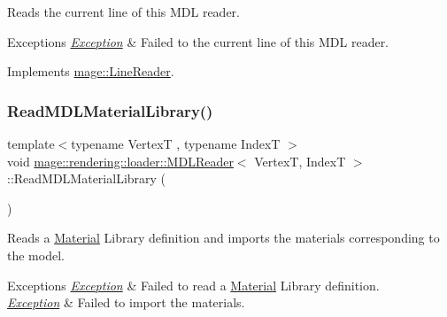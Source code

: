 Reads the current line of this M\+DL reader.


\begin{DoxyExceptions}{Exceptions}
{\em \mbox{\hyperlink{classmage_1_1_exception}{Exception}}} & Failed to the current line of this M\+DL reader. \\
\hline
\end{DoxyExceptions}


Implements \mbox{\hyperlink{classmage_1_1_line_reader_a8c81989a9d59ae31dd19e6d3961cfaf1}{mage\+::\+Line\+Reader}}.

\mbox{\label{classmage_1_1rendering_1_1loader_1_1_m_d_l_reader_a40697c5c645e00ba6f4cc5cd28872b8f}} 
\subsubsection{\texorpdfstring{Read\+M\+D\+L\+Material\+Library()}{ReadMDLMaterialLibrary()}}
{\footnotesize\ttfamily template$<$typename VertexT , typename IndexT $>$ \\
void \mbox{\hyperlink{classmage_1_1rendering_1_1loader_1_1_m_d_l_reader}{mage\+::rendering\+::loader\+::\+M\+D\+L\+Reader}}$<$ VertexT, IndexT $>$\+::Read\+M\+D\+L\+Material\+Library (\begin{DoxyParamCaption}{ }\end{DoxyParamCaption})\hspace{0.3cm}{\ttfamily [private]}}

Reads a \mbox{\hyperlink{classmage_1_1rendering_1_1_material}{Material}} Library definition and imports the materials corresponding to the model.


\begin{DoxyExceptions}{Exceptions}
{\em \mbox{\hyperlink{classmage_1_1_exception}{Exception}}} & Failed to read a \mbox{\hyperlink{classmage_1_1rendering_1_1_material}{Material}} Library definition. \\
\hline
{\em \mbox{\hyperlink{classmage_1_1_exception}{Exception}}} & Failed to import the materials. \\
\hline
\end{DoxyExceptions}
\mbox{\label{classmage_1_1rendering_1_1loader_1_1_m_d_l_reader_afe15d41185ac5f4de6607561d7068d8c}} 
